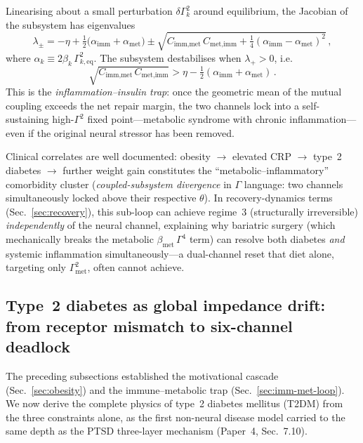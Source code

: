 \documentclass[aps,pre,twocolumn,superscriptaddress,floatfix]{revtex4-2}
\begin{document}
Linearising about a small perturbation
$\delta\Gamma_k^2$ around equilibrium,
the Jacobian of the subsystem has eigenvalues
\begin{equation}
  \lambda_\pm
  = -\eta + \tfrac{1}{2}
    \bigl(\alpha_{\text{imm}} + \alpha_{\text{met}}\bigr)
  \pm \sqrt{C_{\text{imm,met}}\,C_{\text{met,imm}}
    + \tfrac{1}{4}(\alpha_{\text{imm}} - \alpha_{\text{met}})^2}\,,
  \label{eq:imm-met-eigenvalue}
\end{equation}
where
$\alpha_k \equiv 2\beta_k\,\Gamma_{k,\text{eq}}^2$.
The subsystem destabilises when $\lambda_+ > 0$, i.e.
\begin{equation}
  \sqrt{C_{\text{imm,met}}\,C_{\text{met,imm}}}
  > \eta - \tfrac{1}{2}
    (\alpha_{\text{imm}} + \alpha_{\text{met}})\,.
  \label{eq:imm-met-threshold}
\end{equation}
This is the \emph{inflammation--insulin trap}:
once the geometric mean of the mutual coupling
exceeds the net repair margin, the two channels
lock into a self-sustaining high-$\Gamma^2$
fixed point---metabolic syndrome with chronic
inflammation---even if the original neural stressor
has been removed.

Clinical correlates are well documented:
obesity $\to$ elevated CRP $\to$ type~2 diabetes
$\to$ further weight gain constitutes the
``metabolic--inflammatory'' comorbidity cluster
(\emph{coupled-subsystem divergence} in $\Gamma$
language: two channels simultaneously locked
above their respective $\theta$).
In recovery-dynamics terms
(Sec.~\ref{sec:recovery}), this sub-loop can
achieve regime~3 (structurally irreversible)
\emph{independently} of the neural channel,
explaining why bariatric surgery
(which mechanically breaks the metabolic
$\beta_{\text{met}}\,\Gamma^4$ term)
can resolve both diabetes \emph{and} systemic
inflammation simultaneously---a dual-channel
reset that diet alone, targeting only
$\Gamma_{\text{met}}^2$, often cannot achieve.


\subsection{Type~2 diabetes as global impedance drift:
  from receptor mismatch to six-channel deadlock}
\label{sec:t2d-derivation}

The preceding subsections established the motivational
cascade (Sec.~\ref{sec:obesity}) and the immune--metabolic
trap (Sec.~\ref{sec:imm-met-loop}).
We now derive the complete physics of type~2 diabetes
mellitus (T2DM) from the three constraints alone,
as the first non-neural disease model carried to
the same depth as the PTSD three-layer mechanism
(Paper~4, Sec.~7.10).
\end{document}
